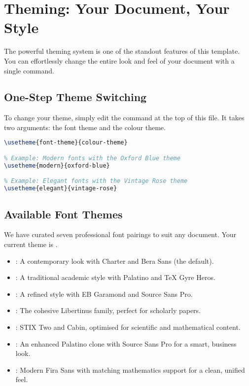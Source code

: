 \documentclass[a4paper,11pt]{report}
\begin{document}
\chapter{Theming: Your Document, Your Style}
\label{chap:theming}
The powerful theming system is one of the standout features of this template. You can effortlessly change the entire look and feel of your document with a single command.

\section{One-Step Theme Switching}
To change your theme, simply edit the \inlinecode{\\usetheme} command at the top of this file. It takes two arguments: the font theme and the colour theme.
\begin{lstlisting}[language=TeX, caption={Using the theme switcher command}, label={lst:themeswitcher}]
% The first parameter is the font theme, the second is the colour theme.
\usetheme{font-theme}{colour-theme}

% Example: Modern fonts with the Oxford Blue theme
\usetheme{modern}{oxford-blue}

% Example: Elegant fonts with the Vintage Rose theme
\usetheme{elegant}{vintage-rose}
\end{lstlisting}

\section{Available Font Themes}
We have curated seven professional font pairings to suit any document. Your current theme is \textbf{\textcolor{accentcolor}{\fonttheme}}.
\begin{itemize}
    \item \textbf{}: A contemporary look with Charter and Bera Sans (the default).
    \item \textbf{}: A traditional academic style with Palatino and TeX Gyre Heros.
    \item \textbf{}: A refined style with EB Garamond and Source Sans Pro.
    \item \textbf{}: The cohesive Libertinus family, perfect for scholarly papers.
    \item \textbf{}: STIX Two and Cabin, optimised for scientific and mathematical content.
    \item \textbf{}: An enhanced Palatino clone with Source Sans Pro for a smart, business look.
    \item \textbf{}: Modern Fira Sans with matching mathematics support for a clean, unified feel.
\end{itemize}
\end{document}
